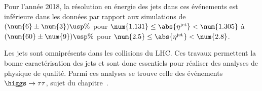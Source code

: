 Pour l'année 2018, la résolution en énergie des jets dans ces événements est inférieure dans les données par rapport aux simulations
de
$(\num{6}\pm\num{3})\usp\%$ pour $\num{1.131} \leq \abs{\eta^\text{jet}} < \num{1.305}$
à
$(\num{60}\pm\num{9})\usp\%$ pour $\num{2.5} \leq \abs{\eta^\text{jet}} < \num{2.8}$.
\par Les jets sont omniprésents dans les collisions du LHC.
Ces travaux permettent la bonne caractérisation des jets et sont donc essentiels pour réaliser des analyses de physique de qualité.
Parmi ces analyses se trouve celle des événements $\higgs\to\tau\tau$, sujet du chapitre~.
